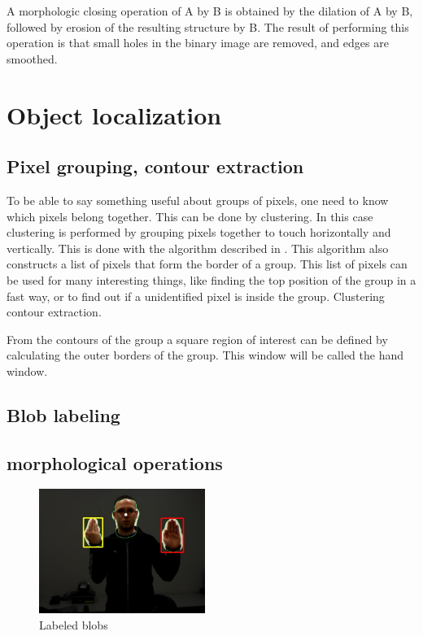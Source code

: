 A morphologic closing operation of A by B is obtained by the dilation of A by B, followed by erosion of the resulting structure by B. The result of performing this operation is that small holes in the binary image are removed, and edges are smoothed.

\section{Object localization}

\subsection*{Pixel grouping, contour extraction}
To be able to say something useful about groups of pixels, one need to know which pixels belong together. This can be done by clustering. In this case clustering is performed by grouping pixels together to touch horizontally and vertically. This is done with the algorithm described in \cite{Suzuki1985}. This algorithm also constructs a list of pixels that form the border of a group. This list of pixels can be used for many interesting things, like finding the top position of the group in a fast way, or to find out if a unidentified pixel is inside the group. Clustering contour extraction\cite{Suzuki1985}.

From the contours of the group a square region of interest can be defined by calculating the outer borders of the group. This window will be called the hand window.

\subsection*{Blob labeling}

\subsection*{morphological operations}
\begin{figure}
  \vspace{-20pt}
  \begin{center}
    \includegraphics[width=0.48\textwidth]{figures/pipeline/contours.jpg}
 \end{center}
  \vspace{-20pt}
	\caption{Labeled blobs}
	\label{fig:contours}
  \vspace{-10pt}
\end{figure}


